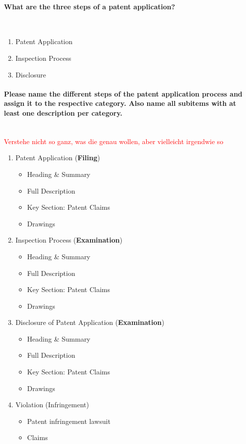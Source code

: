 \documentclass[10pt,a4paper,noendnumber=true]{scrartcl}
\newcommand{\properparagraph}[1]{\paragraph{\textcolor{Emerald}{#1}}\mbox{}\\}
\begin{document}
\properparagraph{What are the three steps of a patent application?}
\begin{enumerate}
	\item Patent Application
	\item Inspection Process
	\item Disclosure
\end{enumerate}
	
\properparagraph{Please name the different steps of the patent application process and assign it to the respective category. Also name all subitems with at least one description per category.}
\textcolor{red}{Verstehe nicht so ganz, was die genau wollen, aber vielleicht irgendwie so}
\begin{enumerate}
	\item Patent Application (\textbf{Filing})
		\begin{itemize}
			\item Heading \& Summary
			\item Full Description
			\item Key Section: Patent Claims
			\item Drawings
		\end{itemize}
	\item Inspection Process (\textbf{Examination})
		\begin{itemize}
			\item Heading \& Summary
			\item Full Description
			\item Key Section: Patent Claims
			\item Drawings
		\end{itemize}
	\item Disclosure of Patent Application (\textbf{Examination})
		\begin{itemize}
			\item Heading \& Summary
			\item Full Description
			\item Key Section: Patent Claims
			\item Drawings
		\end{itemize}
	\item Violation (Infringement)
		\begin{itemize}
			\item Patent infringement lawsuit
			\item Claims
		\end{itemize}
\end{enumerate}
\end{document}
